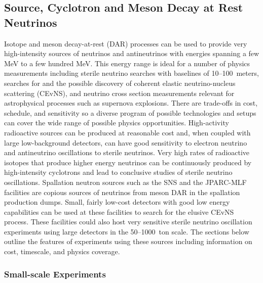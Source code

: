 \subsection{Source, Cyclotron and Meson Decay at Rest Neutrinos}

\label{sec:SourceCyclotronDAR}



Isotope and meson decay-at-rest (DAR) processes can be used to provide
very high-intensity sources of neutrinos and antineutrinos with
energies spanning a few MeV to a few hundred MeV. This energy range
is ideal for a number of physics measurements including sterile
neutrino searches with baselines of 10--100~meters, searches for and
the possible discovery of coherent elastic neutrino-nucleus
scattering (CEvNS), and neutrino cross section measurements relevant
for astrophysical processes such as supernova explosions. There are
trade-offs in cost, schedule, and sensitivity so a diverse program of
possible technologies and setups can cover the wide range of possible
physics opportunities. High-activity radioactive sources can be
produced at reasonable cost and, when coupled with large
low-background detectors, can have good sensitivity to electron
neutrino and antineutrino oscillations to sterile neutrinos. Very high
rates of radioactive isotopes that produce higher energy neutrinos can
be continuously produced by high-intensity cyclotrons and lead to
conclusive studies of sterile neutrino oscillations. Spallation
neutron sources such as the SNS and the JPARC-MLF facilities are
copious sources of neutrinos from meson DAR in the spallation
production dumps. Small, fairly low-cost detectors with good low
energy capabilities can be used at these facilities to search for
the elusive CEvNS process. These facilities could also host very
sensitive sterile neutrino oscillation experiments using large
detectors in the 50--1000~ton scale. The sections below outline the
features of experiments using these sources including
information on cost, timescale, and physics coverage.

\subsubsection{Small-scale Experiments}



